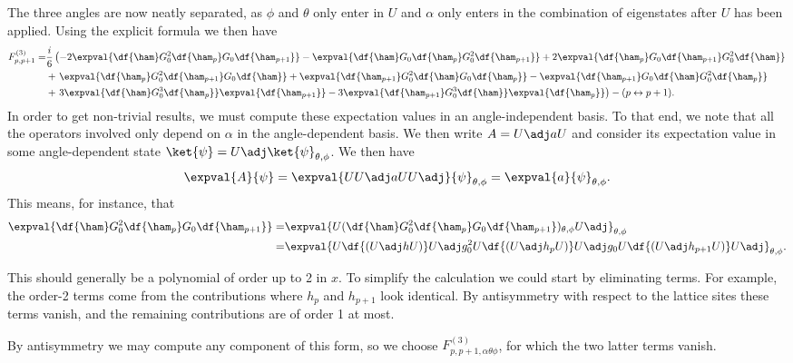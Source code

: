 The three angles are now neatly separated, as $\phi$ and $\theta$ only enter in $U$ and $\alpha$ only enters in the combination of eigenstates after $U$ has been applied. Using the explicit formula we then have
\begin{align*}
	F^{(3)}_{p, p + 1} =& \frac{i}{6}\left(-2\expval{\df{\ham}G_{0}^{2}\df{\ham_{p}}G_{0}\df{\ham_{p + 1}}} - \expval{\df{\ham}G_{0}\df{\ham_{p}}G_{0}^{2}\df{\ham_{p + 1}}} + 2\expval{\df{\ham_{p}}G_{0}\df{\ham_{p + 1}}G_{0}^{2}\df{\ham}} \right. \\
	&+ \left. \expval{\df{\ham_{p}}G_{0}^{2}\df{\ham_{p + 1}}G_{0}\df{\ham}} + \expval{\df{\ham_{p + 1}}G_{0}^{2}\df{\ham}G_{0}\df{\ham_{p}}} - \expval{\df{\ham_{p + 1}}G_{0}\df{\ham}G_{0}^{2}\df{\ham_{p}}} \right. \\
	&+ \left. 3\expval{\df{\ham}G_{0}^{3}\df{\ham_{p}}}\expval{\df{\ham_{p + 1}}} - 3\expval{\df{\ham_{p + 1}}G_{0}^{3}\df{\ham}}\expval{\df{\ham_{p}}}\right) - (p \leftrightarrow p + 1).
\end{align*}
In order to get non-trivial results, we must compute these expectation values in an angle-independent basis. To that end, we note that all the operators involved only depend on $\alpha$ in the angle-dependent basis. We then write $A = U\adj aU$ and consider its expectation value in some angle-dependent state $\ket{\psi} = U\adj\ket{\psi}_{\theta, \phi}$. We then have
\begin{align*}
	\expval{A}{\psi} = \expval{UU\adj aUU\adj}{\psi}_{\theta, \phi} = \expval{a}{\psi}_{\theta, \phi}.
\end{align*}
This means, for instance, that
\begin{align*}
	\expval{\df{\ham}G_{0}^{2}\df{\ham_{p}}G_{0}\df{\ham_{p + 1}}} =& \expval{U(\df{\ham}G_{0}^{2}\df{\ham_{p}}G_{0}\df{\ham_{p + 1}})_{\theta, \phi}U\adj}_{\theta, \phi} \\
	=& \expval{U\df{(U\adj hU)}U\adj g_{0}^{2}U\df{(U\adj h_{p}U)}U\adj g_{0}U\df{(U\adj h_{p + 1}U)}U\adj}_{\theta, \phi}.
\end{align*}

This should generally be a polynomial of order up to 2 in $x$. To simplify the calculation we could start by eliminating terms. For example, the order-2 terms come from the contributions where $h_{p}$ and $h_{p + 1}$ look identical. By antisymmetry with respect to the lattice sites these terms vanish, and the remaining contributions are of order 1 at most.

By antisymmetry we may compute any component of this form, so we choose $F^{(3)}_{p, p + 1, \alpha\theta\phi}$, for which the two latter terms vanish.

